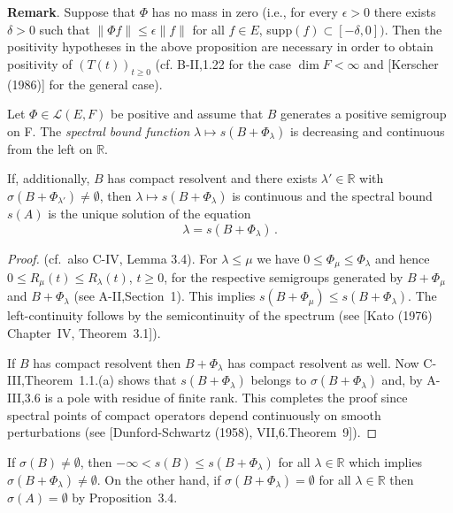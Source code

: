 \noindent
\textbf{Remark}. Suppose that $\Phi$ has no mass in zero (i.e., for every $\epsilon > 0$ there exists $\delta > 0$ such that $\|\Phi f\| \leq \epsilon \|f\|$ for all $f \in E$, supp$(f) \subset [-\delta,0])$. Then the positivity hypotheses in the above proposition are necessary in order to obtain positivity of $(T(t))_{t \geq 0}$ (cf. B-II,1.22 for the case $\dim F < \infty$ and [Kerscher (1986)] for the general case).
\begin{proposition}\label{prop:b4-3.6}
	Let $\Phi \in \mathcal{L}(E,F)$ be positive and assume that $B$ generates a positive semigroup on F. The \emph{spectral bound function} $\lambda \mapsto s(B + \Phi_\lambda)$ is decreasing and continuous from the left on $\mathbb{R}$.
	
	If, additionally, $B$ has compact resolvent and there exists $\lambda' \in \mathbb{R}$ with $\sigma(B + \Phi_{\lambda'}) \neq \emptyset$, then $\lambda \mapsto s(B + \Phi_\lambda)$ is continuous and the spectral bound $s(A)$ is the unique solution of the equation
	\begin{equation}\label{eq:b4-3.5}
		\lambda = s(B + \Phi_\lambda)\,.
	\end{equation}
\end{proposition}

\begin{proof} (cf.\ also C-IV, Lemma 3.4). For $\lambda \leq \mu$ we have $0 \leq \Phi_\mu \leq \Phi_\lambda$ and hence $0 \leq R_\mu(t) \leq R_\lambda(t)$, $t \geq 0$, for the respective semigroups generated by $B + \Phi_\mu$ and $B + \Phi_\lambda$ (see A-II,Section~1). This implies $s(B + \Phi_\mu) \leq s(B + \Phi_\lambda)$. The left-continuity follows by the semicontinuity of the spectrum (see [Kato (1976) Chapter~IV, Theorem~3.1]).

If $B$ has compact resolvent then $B + \Phi_\lambda$ has compact resolvent as well. 
Now C-III,Theorem~1.1.(a) shows that $s(B + \Phi_\lambda)$ belongs to $\sigma(B + \Phi_\lambda)$ and, by A-III,3.6 is a pole with residue of finite rank. This completes the proof since spectral points of compact operators depend continuously on smooth perturbations (see [Dunford-Schwartz (1958), VII,6.Theorem~9]).
\end{proof}

If $\sigma(B) \neq \emptyset$, then $-\infty < s(B) \leq s(B + \Phi_\lambda)$ for all $\lambda \in \mathbb{R}$ which implies $\sigma(B + \Phi_\lambda) \neq \emptyset$. On the other hand, if $\sigma(B + \Phi_\lambda) = \emptyset$ for all $\lambda \in \mathbb{R}$ then $\sigma(A) = \emptyset$ by Proposition~3.4.

